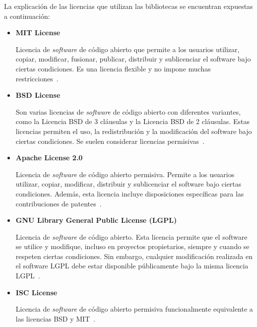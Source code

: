 La explicación de las licencias que utilizan las bibliotecas se encuentran expuestas a continuación:
\begin{itemize}
\item \textbf{MIT License}

Licencia de \textit{software} de código abierto que permite a los usuarios utilizar, copiar, modificar, fusionar, publicar, distribuir y sublicenciar el software bajo ciertas condiciones. Es una licencia flexible y no impone muchas restricciones~\cite{wiki:mit-license}.

\item \textbf{BSD License}

Son varias licencias de \textit{software} de código abierto con diferentes variantes, como la Licencia BSD de 3 cláusulas y la Licencia BSD de 2 cláusulas. Estas licencias permiten el uso, la redistribución y la modificación del software bajo ciertas condiciones. Se suelen considerar licencias permisivas~\cite{wiki:bsd-license}.

\item \textbf{Apache License 2.0}

Licencia de \textit{software} de código abierto permisiva. Permite a los usuarios utilizar, copiar, modificar, distribuir y sublicenciar el software bajo ciertas condiciones. Además, esta licencia incluye disposiciones específicas para las contribuciones de patentes~\cite{apache-license}.

\item \textbf{GNU Library General Public License (LGPL)}

Licencia de \textit{software} de código abierto. Esta licencia permite que el software se utilice y modifique, incluso en proyectos propietarios, siempre y cuando se respeten ciertas condiciones. Sin embargo, cualquier modificación realizada en el software LGPL debe estar disponible públicamente bajo la misma licencia LGPL~\cite{gnu-license}.

\item \textbf{ISC License}

Licencia de \textit{software} de código abierto permisiva funcionalmente equivalente a las licencias BSD y MIT~\cite{wiki:isc-license}.
\end{itemize}

